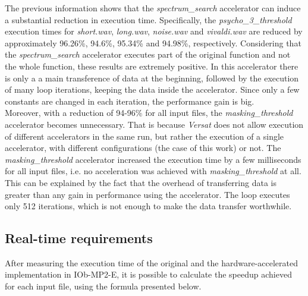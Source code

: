 The previous information shows that the \textit{spectrum\_search} accelerator can induce a substantial reduction in execution time. Specifically, the \textit{psycho\_3\_threshold} execution times for \textit{short.wav}, \textit{long.wav}, \textit{noise.wav} and \textit{vivaldi.wav} are reduced by approximately 96.26\%, 94.6\%, 95.34\% and 94.98\%, respectively.
Considering that the \textit{spectrum\_search} accelerator executes part of the original function and not the whole function, these results are extremely positive. In this accelerator there is only a a main transference of data at the beginning, followed by the execution of many loop iterations, keeping the data inside the accelerator. Since only a few constants are changed in each iteration, the performance gain is big.\\
Moreover, with a reduction of 94-96\% for all input files, the \textit{masking\_threshold} accelerator becomes unnecessary. That is because \textit{Versat} does not allow execution of different accelerators in the same run, but rather the execution of a single accelerator, with different configurations (the case of this work) or not.
The \textit{masking\_threshold} accelerator increased the execution time by a few milliseconds for all input files, i.e. no acceleration was achieved with \textit{masking\_threshold} at all. This can be explained by the fact that the overhead of transferring data is greater than any gain in performance using the accelerator. The loop executes only 512 iterations, which is not enough to make the data transfer worthwhile.


\subsection{Real-time requirements}


After measuring the execution time of the original and the hardware-accelerated implementation in IOb-MP2-E, it is possible to calculate the speedup achieved for each input file, using the formula presented below.

